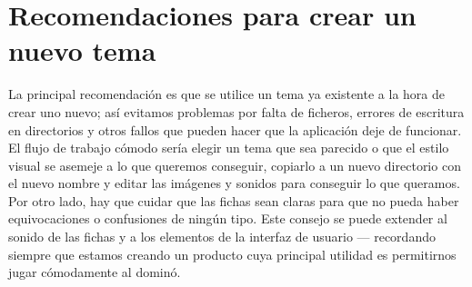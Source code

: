 \section{Recomendaciones para crear un nuevo tema}

La principal recomendación es que se utilice un tema ya existente a la hora de crear uno nuevo; así evitamos problemas
por falta de ficheros, errores de escritura en directorios y otros fallos que pueden hacer que la aplicación deje de funcionar.
El flujo de trabajo cómodo sería elegir un tema que sea parecido o que el estilo visual se asemeje a lo que queremos conseguir,
copiarlo a un nuevo directorio con el nuevo nombre y editar las imágenes y sonidos para conseguir lo que queramos. \\

Por otro lado, hay que cuidar que las fichas sean claras para que no pueda haber equivocaciones o confusiones de ningún
tipo. Este consejo se puede extender al sonido de las fichas y a los elementos de la interfaz de usuario --- recordando
siempre que estamos creando un producto cuya principal utilidad es permitirnos jugar cómodamente al dominó. \\
